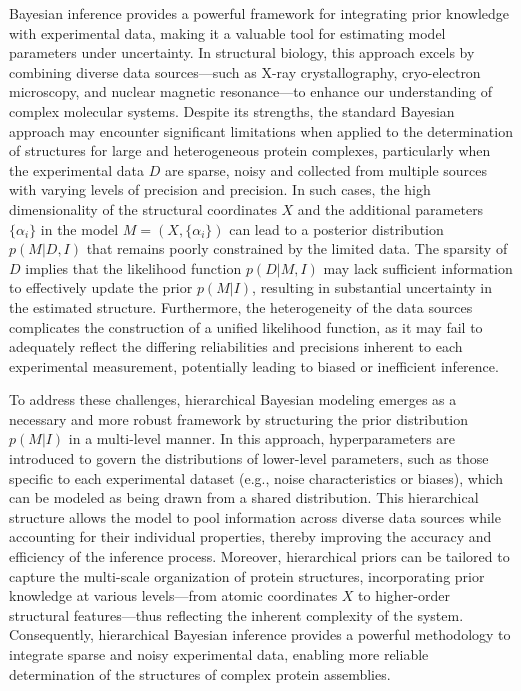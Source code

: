 \documentclass[journal=jcim,manuscript=article]{achemso}
\begin{document}
Bayesian inference provides a powerful framework for integrating prior knowledge with experimental data, making it a valuable tool for estimating model parameters under uncertainty. In structural biology, this approach excels by combining diverse data sources—such as X-ray crystallography, cryo-electron microscopy, and nuclear magnetic resonance—to enhance our understanding of complex molecular systems. Despite its strengths, the standard Bayesian approach may encounter significant limitations when applied to the determination of structures for large and heterogeneous protein complexes, particularly when the experimental data $D$ are sparse, noisy and collected from multiple sources with varying levels of precision and precision. In such cases, the high dimensionality of the structural coordinates $X$ and the additional parameters $\{\alpha_i\}$ in the model $M=(X,\{\alpha_i\})$ can lead to a posterior distribution $p(M|D,I)$ that remains poorly constrained by the limited data. The sparsity of $D$ implies that the likelihood function $p(D|M,I)$ may lack sufficient information to effectively update the prior $p(M|I)$, resulting in substantial uncertainty in the estimated structure. Furthermore, the heterogeneity of the data sources complicates the construction of a unified likelihood function, as it may fail to adequately reflect the differing reliabilities and precisions inherent to each experimental measurement, potentially leading to biased or inefficient inference.

To address these challenges, hierarchical Bayesian modeling emerges as a necessary and more robust framework by structuring the prior distribution $p(M|I)$ in a multi-level manner. In this approach, hyperparameters are introduced to govern the distributions of lower-level parameters, such as those specific to each experimental dataset (e.g., noise characteristics or biases), which can be modeled as being drawn from a shared distribution. This hierarchical structure allows the model to pool information across diverse data sources while accounting for their individual properties, thereby improving the accuracy and efficiency of the inference process. Moreover, hierarchical priors can be tailored to capture the multi-scale organization of protein structures, incorporating prior knowledge at various levels---from atomic coordinates $X$ to higher-order structural features---thus reflecting the inherent complexity of the system. Consequently, hierarchical Bayesian inference provides a powerful methodology to integrate sparse and noisy experimental data, enabling more reliable determination of the structures of complex protein assemblies.
\end{document}
